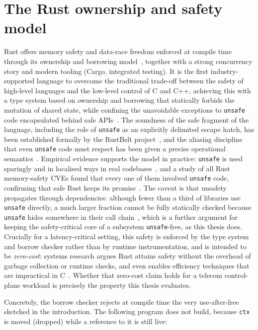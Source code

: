 \documentclass[english,twoside,openright,a4paper,censored,csm,software-track-2020]{HYthesisML}
\begin{document}
\section{The Rust ownership and safety model}
Rust offers memory safety and data-race freedom enforced at compile time through its
ownership and borrowing model~\cite{klabnik2023rust}, together with a strong concurrency
story and modern tooling (Cargo, integrated testing). It is the first industry-supported
language to overcome the traditional trade-off between the safety of high-level languages and
the low-level control of C and C++, achieving this with a type system based on ownership and
borrowing that statically forbids the mutation of shared state, while confining the
unavoidable exceptions to \texttt{unsafe} code encapsulated behind safe
APIs~\cite{jung2021safe}. The soundness of the safe fragment of the language, including the
role of \texttt{unsafe} as an explicitly delimited escape hatch, has been established formally
by the RustBelt project~\cite{jung2018rustbelt}, and the aliasing discipline that even
\texttt{unsafe} code must respect has been given a precise operational
semantics~\cite{jung2020stacked}. Empirical evidence supports the model in
practice: \texttt{unsafe} is used sparingly and in localised ways in real
codebases~\cite{astrauskas2020unsafe,qin2020rust}, and a study of all Rust memory-safety CVEs
found that every one of them involved \texttt{unsafe} code, confirming that safe Rust keeps
its promise~\cite{xu2021rustcve}. The caveat is that unsafety propagates through dependencies:
although fewer than a third of libraries use \texttt{unsafe} directly, a much larger fraction
cannot be fully statically checked because \texttt{unsafe} hides somewhere in their call
chain~\cite{evans2020rust}, which is a further argument for keeping the safety-critical core of
a subsystem \texttt{unsafe}-free, as this thesis does. Crucially for a latency-critical setting, this safety is
enforced by the type system and borrow checker rather than by runtime instrumentation, and is
intended to be \emph{zero-cost}: systems research argues Rust attains safety without the
overhead of garbage collection or runtime checks, and even enables efficiency techniques that
are impractical in C~\cite{balasubramanian2017rust}. Whether that zero-cost claim holds for a
telecom control-plane workload is precisely the property this thesis evaluates.

Concretely, the borrow checker rejects at compile time the very use-after-free sketched in the
introduction. The following program does not build, because \texttt{ctx} is moved (dropped)
while a reference to it is still live:
\end{document}
